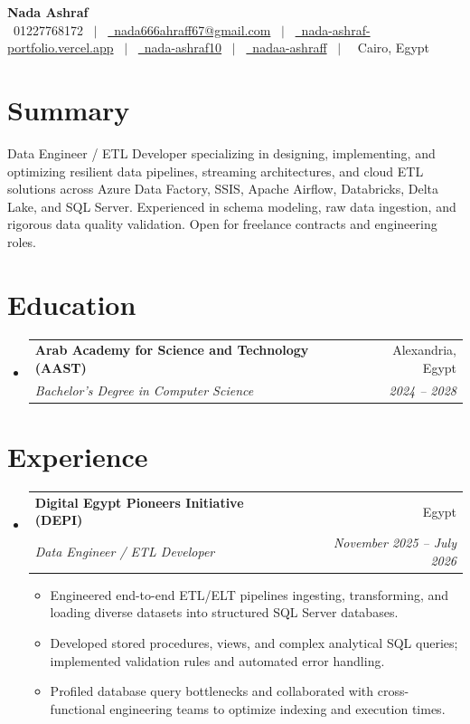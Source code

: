 \documentclass[letterpaper,9pt]{article}
\makeatletter
\newcommand{\resumeSubheading}[4]{
  \item
  \begin{tabular*}{0.99\textwidth}[t]{l@{\extracolsep{\fill}}r}
    \textbf{#1} & \small{#2} \\
    \textit{\small#3} & \textit{\small#4} \\
  \end{tabular*}\vspace{-2pt}
}
\newcommand{\resumeSubHeadingList}{\begin{itemize}[leftmargin=0.12in, label={}, topsep=1pt, itemsep=1pt, parsep=0pt, partopsep=0pt]}
\newcommand{\resumeSubHeadingListEnd}{\end{itemize}\vspace{-2pt}}
\makeatother
\begin{document}
\begin{center}
  {\textbf{\huge Nada Ashraf}} \\[3pt]
  \footnotesize
  \faPhone\ 01227768172
  \ $|$ \
  \href{mailto:nada666ahraff67@gmail.com}{\faEnvelope\ nada666ahraff67@gmail.com}
  \ $|$ \
  \href{https://nada-ashraf-portfolio.vercel.app}{\faGlobe\ nada-ashraf-portfolio.vercel.app}
  \ $|$ \
  \href{https://github.com/nada-ashraf10}{\faGithub\ nada-ashraf10}
  \ $|$ \
  \href{https://www.linkedin.com/in/nadaa-ashraff}{\faLinkedin\ nadaa-ashraff}
  \ $|$ \
  \faMapMarker\ Cairo, Egypt
\end{center}
\vspace{-8pt}

\section*{Summary}
\small{Data Engineer / ETL Developer specializing in designing, implementing, and optimizing resilient data pipelines, streaming architectures, and cloud ETL solutions across Azure Data Factory, SSIS, Apache Airflow, Databricks, Delta Lake, and SQL Server. Experienced in schema modeling, raw data ingestion, and rigorous data quality validation. Open for freelance contracts and engineering roles.}

\section{Education}
\resumeSubHeadingList
  \resumeSubheading
    {Arab Academy for Science and Technology (AAST)}{Alexandria, Egypt}
    {Bachelor's Degree in Computer Science}{2024 -- 2028}
\resumeSubHeadingListEnd

\section{Experience}
\resumeSubHeadingList
  \resumeSubheading
    {Digital Egypt Pioneers Initiative (DEPI)}{Egypt}
    {Data Engineer / ETL Developer}{November 2025 -- July 2026}
    \begin{itemize}[leftmargin=0.15in, itemsep=-0.5pt, topsep=1pt, parsep=0pt]
      \item \small{Engineered end-to-end ETL/ELT pipelines ingesting, transforming, and loading diverse datasets into structured SQL Server databases.}
      \item \small{Developed stored procedures, views, and complex analytical SQL queries; implemented validation rules and automated error handling.}
      \item \small{Profiled database query bottlenecks and collaborated with cross-functional engineering teams to optimize indexing and execution times.}
    \end{itemize}
\resumeSubHeadingListEnd
\end{document}
